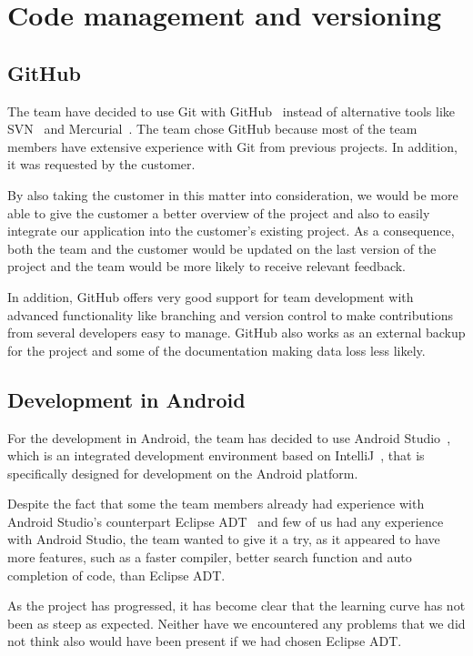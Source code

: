 \section{Code management and versioning}
\subsection{GitHub}
The team have decided to use Git with GitHub~\cite{github} instead of alternative tools like SVN~\cite{svn} and Mercurial~\cite{mercurial}. 
The team chose GitHub because most of the team members have extensive experience with Git from previous projects. In addition, it was requested by the customer. 

By also taking the customer in this matter into consideration, we would be more able to give the customer a better overview of the project and also to easily integrate our application into the customer's existing project. As a consequence, both the team and the customer would be updated on the last version of the project and the team would be more likely to receive relevant feedback. 

In addition, GitHub offers very good support for team development 
with advanced functionality like branching and version control to make contributions from several developers easy 
to manage. GitHub also works as an external backup for the project and some of the documentation making data loss less likely.

\subsection{Development in Android}
For the development in Android, the team has decided to use Android Studio~\cite{android-studio}, which is an integrated development environment based on IntelliJ~\cite{intellij}, that is specifically designed for development on the Android platform.

Despite the fact that some the team members already had experience with Android Studio's counterpart Eclipse ADT~\cite{eclipseadt} and few of us had any experience with Android Studio, the team wanted to give it a try, as it appeared to have more features, such as a faster compiler, better search function and auto completion of code, than Eclipse ADT. 

As the project has progressed, it has become clear that the learning curve has not been as steep as expected. Neither have we encountered any problems that we did not think also would have been present if we had chosen Eclipse ADT.

